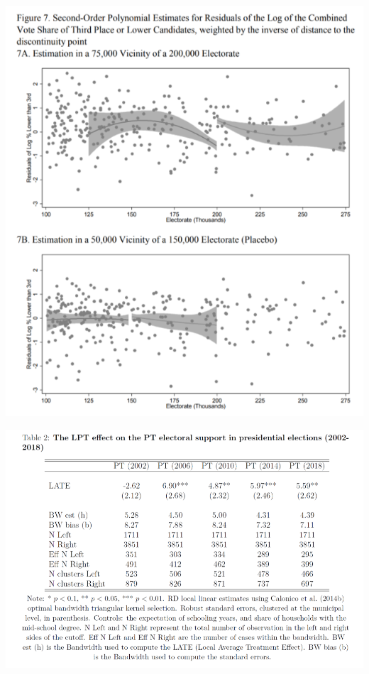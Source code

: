 \documentclass[xcolor=x11names,compress]{beamer}\usepackage[]{graphicx}\usepackage[]{color}
\renewcommand{\(}{\begin{columns}}
\renewcommand{\)}{\end{columns}}
\newcommand{\<}[1]{\begin{column}{#1}}
\renewcommand{\>}{\end{column}}
\begin{document}
\begin{frame}
\includegraphics[scale=0.4]{placebo_2.png}
\end{frame}

\begin{frame}
\includegraphics[width=\linewidth]{placebo.png}
\end{frame}
\end{document}
